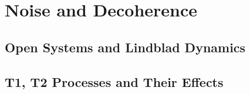 \chapter{Noise and Decoherence}
\section{Open Systems and Lindblad Dynamics}
\section{T1, T2 Processes and Their Effects}

